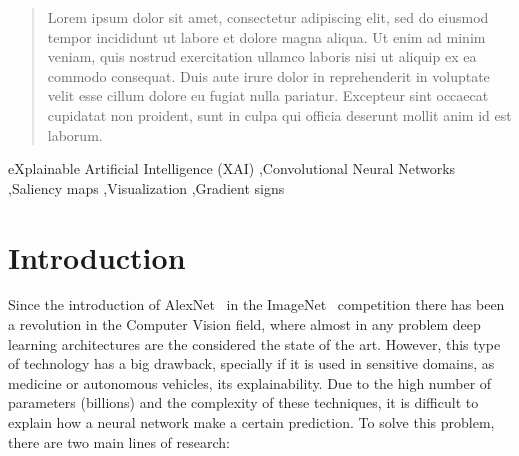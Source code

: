 \documentclass[preprint,12pt]{elsarticle}
\begin{document}
\begin{frontmatter}
\author[inst2]{Jaime Boal}
\author[inst2]{Eugenio F. Sánchez-Úbeda}


\begin{abstract}
Lorem ipsum dolor sit amet, consectetur adipiscing elit, sed do eiusmod tempor incididunt ut labore et dolore magna aliqua. Ut enim ad minim veniam, quis nostrud exercitation ullamco laboris nisi ut aliquip ex ea commodo consequat. Duis aute irure dolor in reprehenderit in voluptate velit esse cillum dolore eu fugiat nulla pariatur. Excepteur sint occaecat cupidatat non proident, sunt in culpa qui officia deserunt mollit anim id est laborum.
\end{abstract}



\begin{keyword}
eXplainable Artificial Intelligence (XAI) \sep Convolutional Neural Networks \sep Saliency maps \sep Visualization \sep Gradient signs
\end{keyword}

\end{frontmatter}


\section{Introduction}
\label{sec:introduction}
Since the introduction of AlexNet~\cite{Krizhevsky2012} in the ImageNet~\cite{ImageNet} competition there has been a revolution in the Computer Vision field, where almost in any problem deep learning architectures are the considered the state of the art. However, this type of technology has a big drawback, specially if it is used in sensitive domains, as medicine or autonomous vehicles, its explainability. Due to the high number of parameters (billions) and the complexity of these techniques, it is difficult to explain how a neural network make a certain prediction. To solve this problem, there are two main lines of research:
\end{document}
